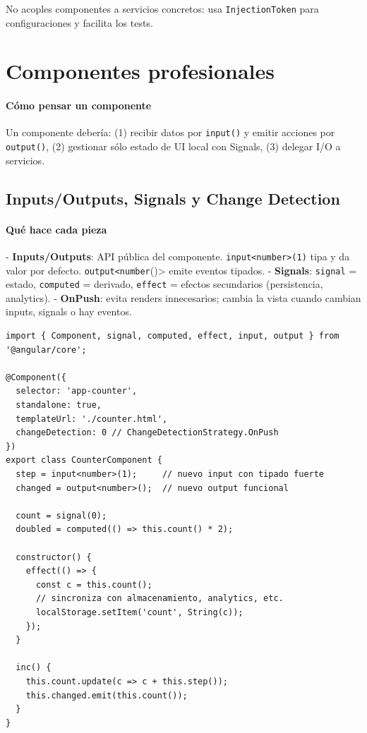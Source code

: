 \documentclass[11pt,a4paper]{article}
\begin{document}
\begin{warnbox}
No acoples componentes a servicios concretos: usa \texttt{InjectionToken} para configuraciones y facilita los tests.
\end{warnbox}

\section{Componentes profesionales}
\paragraph{Cómo pensar un componente}
Un componente debería: (1) recibir datos por \texttt{input()} y emitir acciones por \texttt{output()}, (2) gestionar sólo estado de UI local con Signals, (3) delegar I/O a servicios.

\subsection{Inputs/Outputs, Signals y Change Detection}
\paragraph{Qué hace cada pieza}
- \textbf{Inputs/Outputs}: API pública del componente. \texttt{input<number>(1)} tipa y da valor por defecto. \texttt{output<number}()> emite eventos tipados.
- \textbf{Signals}: \texttt{signal} = estado, \texttt{computed} = derivado, \texttt{effect} = efectos secundarios (persistencia, analytics).
- \textbf{OnPush}: evita renders innecesarios; cambia la vista cuando cambian inputs, signals o hay eventos.

\begin{lstlisting}[style=tsstyle, caption={Componente con Signals, OnPush y efecto de sincronización}]
import { Component, signal, computed, effect, input, output } from '@angular/core';

@Component({
  selector: 'app-counter',
  standalone: true,
  templateUrl: './counter.html',
  changeDetection: 0 // ChangeDetectionStrategy.OnPush
})
export class CounterComponent {
  step = input<number>(1);     // nuevo input con tipado fuerte
  changed = output<number>();  // nuevo output funcional

  count = signal(0);
  doubled = computed(() => this.count() * 2);

  constructor() {
    effect(() => {
      const c = this.count();
      // sincroniza con almacenamiento, analytics, etc.
      localStorage.setItem('count', String(c));
    });
  }

  inc() {
    this.count.update(c => c + this.step());
    this.changed.emit(this.count());
  }
}
\end{lstlisting}
\end{document}
